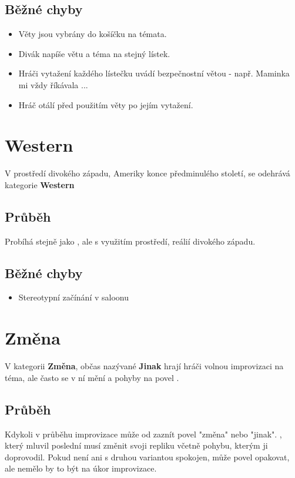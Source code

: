  
\subsection{ Běžné chyby } \begin{itemize}
\item Věty jsou vybrány do košíčku na témata.
\item Divák napíše větu a téma na stejný lístek.
\item Hráči vytažení každého lístečku uvádí bezpečnostní větou - např. Maminka mi vždy říkávala ...
\item Hráč otálí před použitím věty po jejím vytažení.
\end{itemize}
 
 
 
 
 
\needspace{5cm} \section{Western} \label{western}  
 
V prostředí divokého západu, Ameriky konce předminulého století, se odehrává kategorie \textbf{Western}{} 
 
\subsection{Průběh} Probíhá stejně jako , ale s využitím prostředí, reálií divokého západu.  
 
\subsection{Běžné chyby} \begin{itemize}
\item Stereotypní začínání v saloonu
\end{itemize}
 
 
 
 
\needspace{5cm} \section{Změna} \label{změna}  
 
 
V kategorii \textbf{Změna}{}, občas nazývané \textbf{Jinak}{} hrají hráči volnou improvizaci na téma, ale často se v ní mění  a pohyby na povel . 
 
 
\subsection{ Průběh } Kdykoli v průběhu improvizace může od  zaznít povel "změna"{} nebo "jinak". , který mluvil poslední musí změnit svoji repliku včetně pohybu, kterým ji doprovodil. Pokud není  ani s druhou variantou spokojen, může povel opakovat, ale nemělo by to být na úkor improvizace. 
 
